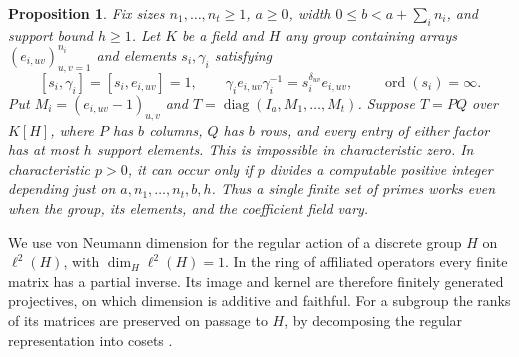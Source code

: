 \documentclass[11pt,a4paper]{article}
\newtheorem{proposition}[theorem]{Proposition}
\numberwithin{equation}{section}
\begin{document}
\begin{proposition}\label{prop:bounded-shear-primes}
Fix sizes \(n_1,\ldots,n_t\geq 1\), \(a\geq 0\), width \(0\leq b<a+\sum_i n_i\), and support bound \(h\geq 1\). Let \(K\) be a field and \(H\) any group containing arrays \((e_{i,uv})_{u,v=1}^{n_i}\) and elements \(s_i,\gamma_i\) satisfying
\[
 [s_i,\gamma_i]=[s_i,e_{i,uv}]=1,\qquad
 \gamma_i e_{i,uv}\gamma_i^{-1}=s_i^{\delta_{uv}}e_{i,uv},
 \qquad \operatorname{ord}(s_i)=\infty .
\]
Put \(M_i=(e_{i,uv}-1)_{u,v}\) and \(T=\operatorname{diag}(I_a,M_1,\ldots,M_t)\). Suppose \(T=PQ\) over \(K[H]\), where \(P\) has \(b\) columns, \(Q\) has \(b\) rows, and every entry of either factor has at most \(h\) support elements. This is impossible in characteristic zero. In characteristic \(p>0\), it can occur only if \(p\) divides a computable positive integer depending just on \(a,n_1,\ldots,n_t,b,h\). Thus a single finite set of primes works even when the group, its elements, and the coefficient field vary.
\end{proposition}
We use von Neumann dimension for the regular action of a discrete group \(H\) on \(\ell^2(H)\), with \(\dim_H\ell^2(H)=1\). In the ring of affiliated operators every finite matrix has a partial inverse. Its image and kernel are therefore finitely generated projectives, on which dimension is additive and faithful. For a subgroup the ranks of its matrices are preserved on passage to \(H\), by decomposing the regular representation into cosets \cite[Chapters~6 and~8]{LuckAff}.
\end{document}
